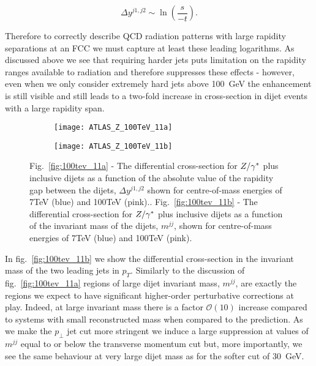 	\begin{equation}
		\Delta y^{j1, j2}\sim \ln\left(\frac{s}{-t}\right).
	\end{equation}

	Therefore to correctly describe QCD radiation patterns with large rapidity separations at an FCC
	we must capture at least these leading logarithms.  As discussed above we see that requiring harder
	jets puts limitation on the rapidity ranges available to radiation and therefore suppresses these
	effects - however, even when we only consider extremely hard jets above 100~GeV the enhancement is
	still visible and still leads to a two-fold increase in cross-section in dijet events with a large
	rapidity span.

	\begin{figure}[bth]
		\centering
		\begin{subfigure}[b]{0.49\textwidth}
			\texttt{[image: ATLAS\_Z\_100TeV\_11a]}
			\caption{}
			\label{fig:100tev_11a}
		\end{subfigure}
		\begin{subfigure}[b]{0.49\textwidth}
			\texttt{[image: ATLAS\_Z\_100TeV\_11b]}
			\caption{}
			\label{fig:100tev_11b}
		\end{subfigure}
		\caption{Fig.~\eqref{fig:100tev_11a} - The differential cross-section for $Z/\gamma^*$ plus inclusive dijets as a function
		of the absolute value of the rapidity gap between the dijets, $\Delta y^{j1, j2}$ shown for centre-of-mass energies
		of 7TeV (blue) and 100TeV (pink).. Fig.~\eqref{fig:100tev_11b} - The differential cross-section for $Z/\gamma^*$ plus
		inclusive dijets as a function of the invariant mass of the dijets, $m^{jj}$, shown for centre-of-mass energies
		of 7TeV (blue) and 100TeV (pink).}
	\end{figure}

	In fig.~\eqref{fig:100tev_11b} we show the differential cross-section in the invariant mass of the two leading
	jets in $p_T$.  Similarly to the discussion of fig.~\eqref{fig:100tev_11a} regions of large dijet invariant mass,
	$m^{jj}$, are exactly the regions we expect to have significant higher-order perturbative corrections at play.
	Indeed, at large invariant mass there is a factor $\mathcal{O}(10)$ increase compared to systems with small
	reconstructed mass when compared to the \stev prediction.  As we make the $p_\perp$ jet cut more stringent
	we induce a large suppression at values of $m^{jj}$ equal to or below the transverse momentum cut but, more
	importantly, we see the same behaviour at very large dijet mass as for the softer cut of 30~GeV.

